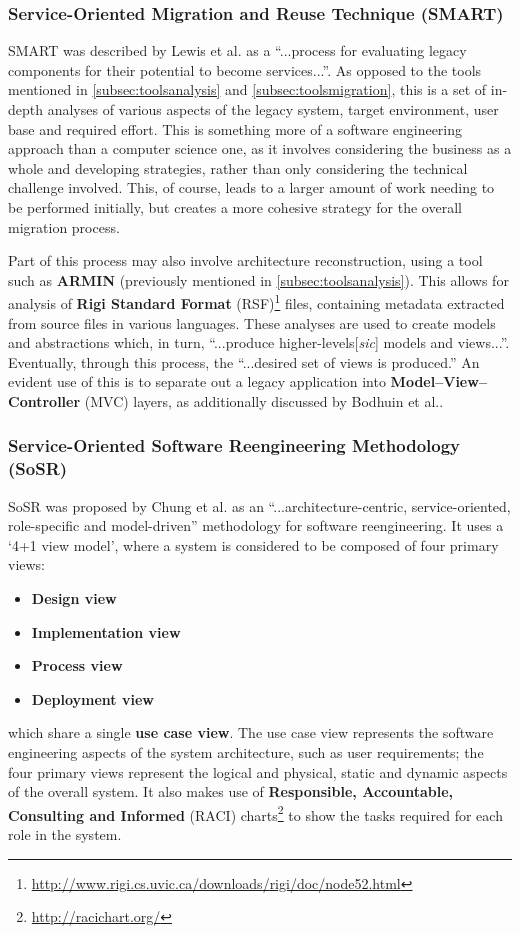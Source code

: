 \documentclass[12pt,journal,compsoc]{IEEEtran}
\begin{document}
\subsubsection{Service-Oriented Migration and Reuse Technique (SMART)}
\label{subsubsec:smart}
SMART was described by Lewis et al. as a ``...process for evaluating legacy components for their potential to become services...''\cite{Lewis2005,Lewis2005a}. As opposed to the tools mentioned in \autoref{subsec:toolsanalysis} and \autoref{subsec:toolsmigration}, this is a set of in-depth analyses of various aspects of the legacy system, target environment, user base and required effort. This is something more of a software engineering approach than a computer science one, as it involves considering the business as a whole and developing strategies, rather than only considering the technical challenge involved. This, of course, leads to a larger amount of work needing to be performed initially, but creates a more cohesive strategy for the overall migration process.

Part of this process may also involve architecture reconstruction, using a tool such as \textbf{ARMIN} (previously mentioned in \autoref{subsec:toolsanalysis}). This allows for analysis of \textbf{Rigi Standard Format} (RSF)\footnote{\url{http://www.rigi.cs.uvic.ca/downloads/rigi/doc/node52.html}} files, containing metadata extracted from source files in various languages\cite{O'Brien2005}. These analyses are used to create models and abstractions which, in turn, ``...produce higher-levels[\textit{sic}] models and views...''\cite{O'Brien2005}. Eventually, through this process, the ``...desired set of views is produced.''\cite{O'Brien2005} An evident use of this is to separate out a legacy application into \textbf{Model--View--Controller} (MVC) layers, as additionally discussed by Bodhuin et al.\cite{Bodhuin2002}.

\subsubsection{Service-Oriented Software Reengineering Methodology (SoSR)}
\label{subsubsec:sosr}
SoSR was proposed by Chung et al. as an ``...architecture-centric, service-oriented, role-specific and model-driven''\cite{Chung2007} methodology for software reengineering. It uses a `4+1 view model', where a system is considered to be composed of four primary views:
\begin{itemize}
\item \textbf{Design view}
\item \textbf{Implementation view}
\item \textbf{Process view}
\item \textbf{Deployment view}
\end{itemize}
which share a single \textbf{use case view}. The use case view represents the software engineering aspects of the system architecture, such as user requirements; the four primary views represent the logical and physical, static and dynamic aspects of the overall system. It also makes use of \textbf{Responsible, Accountable, Consulting and Informed} (RACI) charts\footnote{\url{http://racichart.org/}} to show the tasks required for each role in the system.
\end{document}
